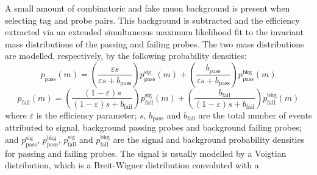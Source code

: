 

A small amount of combinatoric and fake muon background is present when 
selecting tag and probe pairs.
This background is subtracted and the efficiency extracted via an extended 
simultaneous maximum likelihood fit to the invariant mass distributions of the 
passing and failing probes. The two mass distributions are modelled, 
respectively, by the following probability densities:
\begin{equation}
p_{\mathrm{pass}}(m) = \left(\frac{\varepsilon s}{\varepsilon s + 
b_{\mathrm{pass}}}\right) p_{\mathrm{pass}}^{\mathrm{sig}}(m) + 
\left(\frac{b_{\mathrm{pass}}}{\varepsilon s + b_{\mathrm{pass}}}\right) 
p_{\mathrm{pass}}^{\mathrm{bkg}}(m)
\end{equation}
\begin{equation}
p_{\mathrm{fail}}(m) = \left(\frac{(1 - \varepsilon )s}{(1 - \varepsilon)s + 
b_{\mathrm{fail}}}\right) p_{\mathrm{fail}}^{\mathrm{sig}}(m) + 
\left(\frac{b_{\mathrm{fail}}}{(1 - \varepsilon)s + b_{\mathrm{fail}}}\right) 
p_{\mathrm{fail}}^{\mathrm{bkg}}(m)
\end{equation}
where $\varepsilon$ is the efficiency parameter; $s$, $b_{\mathrm{pass}}$ and 
$b_{\mathrm{fail}}$ are the total number of 
events attributed to signal, background passing probes and background failing 
probes; and $p_{\mathrm{pass}}^{\mathrm{sig}}$, 
$p_{\mathrm{pass}}^{\mathrm{bkg}}$, $p_{\mathrm{fail}}^{\mathrm{sig}}$ and 
$p_{\mathrm{fail}}^{\mathrm{bkg}}$ are the signal and background probability 
densities for passing and failing probes. The signal is usually modelled by a 
Voigtian distribution, which is a Breit-Wigner distribution convoluted with a 
